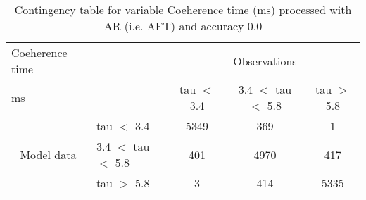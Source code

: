 \begin{table}[]
\begin{center}
\begin{tabular}{llccc}
\hline
{Coeherence time}                                       &                                                    & \multicolumn{3}{c}{Observations}                 \\
{ms}                                       &                             & tau $<$ 3.4   & 3.4 $<$ tau $<$ 5.8 & tau $>$ 5.8 \\
\hline
\multicolumn{1}{c}{\multirow{3}{*}{Model data}}  & tau $<$ 3.4             & 5349                & 369                       & 1              \\
                                                 & 3.4  $<$ tau $<$ 5.8 & 401                & 4970                       & 417              \\
                                                 & tau $>$ 5.8             & 3                & 414                       & 5335              \\
\hline
\end{tabular}
\end{center}
\caption{Contingency table for variable Coeherence time (ms) processed with AR (i.e. AFT) and accuracy 0.0}
\label{tab:contingencytauAFT}
\end{table}

